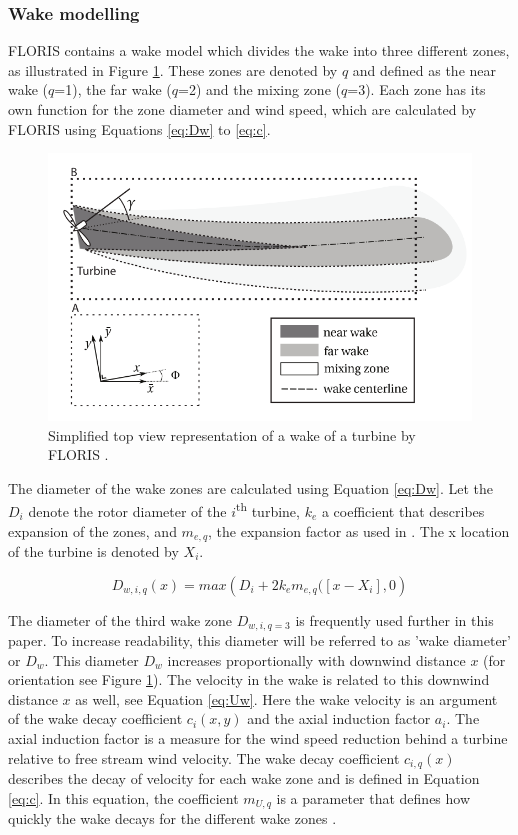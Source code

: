 \subsubsection{Wake modelling}
\label{wakemodel}
FLORIS contains a wake model which divides the wake into three different zones, as illustrated in Figure \ref{fig:wake}. These zones are denoted by $q$ and defined as the near wake ($q$=1), the far wake ($q$=2) and the mixing zone ($q$=3). Each zone has its own function for the zone diameter and wind speed, which are calculated by FLORIS using Equations \ref{eq:Dw} to \ref{eq:c}. 


\begin{figure}
  	\includegraphics[width=\linewidth]{./Figures/WakeFLORIS.png}
  	\caption{Simplified top view representation of a wake of a turbine by FLORIS \cite{Gebraad2016}.}
	\label{fig:wake}
\end{figure}

The diameter of the wake zones are calculated using Equation \ref{eq:Dw}. Let the $D_i$ denote the rotor diameter of the $i${\textsuperscript{th}} turbine, $k_e$ a coefficient that describes expansion of the zones, and $m_{e,q}$, the expansion factor as used in \cite{Gebraad2016}. The x location of the turbine is denoted by $X_i$.

\begin{equation}
\label{eq:Dw}
D_{w,i,q}(x) = max({D_i + 2k_em_{e,q}([x - X_i],0} )
\end{equation}

The diameter of the third wake zone $D_{w,i,q=3}$ is frequently used further in this paper. To increase readability, this diameter will be referred to as 'wake diameter' or $D_w$. This diameter $D_w$ increases proportionally with downwind distance $x$ (for orientation see Figure \ref{fig:wake}).
The velocity in the wake is related to this downwind distance $x$ as well, see Equation \ref{eq:Uw}. Here the wake velocity is an argument of the wake decay coefficient $c_{i}(x,y)$ and the axial induction factor $a_i$. The axial induction factor is a measure for the wind speed reduction behind a turbine relative to free stream wind velocity. The wake decay coefficient $c_{i,q}(x)$ describes the decay of velocity for each wake zone and is defined in Equation \ref{eq:c}. In this equation, the coefficient $m_{U,q}$ is a parameter that defines how quickly the wake decays for the different wake zones \cite{Gebraad2016}.

